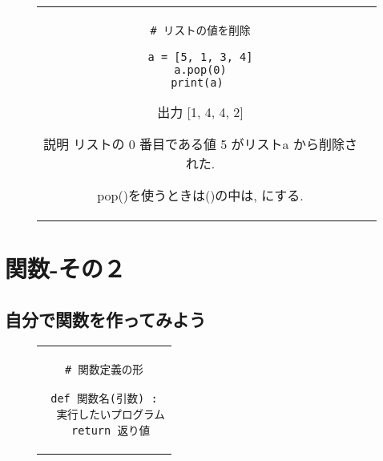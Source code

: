 \documentclass{jsarticle}
\begin{document}
\begin{figure}[h]
	\begin{tabular}{cc}
		\begin{minipage}[t]{.4\textwidth}
			\begin{lstlisting}[caption=リストの値を削除]
# リストの値を削除

a = [5, 1, 3, 4]
a.pop(0)
print(a) \end{lstlisting}
		\end{minipage} \hspace{5mm}
		\begin{minipage}[t]{.6\textwidth}
			\begin{minipage}[t]{.3\textwidth}
				\begin{itembox}[l]{出力}
					[1, 4, 4, 2]
				\end{itembox}
			\end{minipage}
			\begin{itembox}[l]{説明}
				リストの 0 番目である値 5 がリストa から削除された.  \par
				pop()を使うときは()の中は, {\textgt{削除したい値の添え字}}にする.  \par
			\end{itembox}
		\end{minipage}
	\end{tabular}
\end{figure}


\section{関数-その２}
\subsection{自分で関数を作ってみよう}
\begin{figure}[h]
	\begin{tabular}{c}
		\begin{minipage}[t]{.4\textwidth}
			\begin{lstlisting}[caption=関数定義の形]
# 関数定義の形

def 関数名(引数) :
  実行したいプログラム
  return 返り値
\end{lstlisting}
		\end{minipage}
	\end{tabular}
\end{figure}
\end{document}
